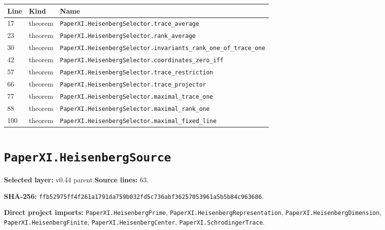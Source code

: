 \documentclass[10pt,oneside]{book}
\begin{document}
\begin{longtable}{@{}p{}p{}p{}@{}}\toprule Line&Kind&Name\\\midrule\endhead

17&theorem&\nolinkurl{PaperXI.HeisenbergSelector.trace_average}\\

23&theorem&\nolinkurl{PaperXI.HeisenbergSelector.rank_average}\\

30&theorem&\nolinkurl{PaperXI.HeisenbergSelector.invariants_rank_one_of_trace_one}\\

42&theorem&\nolinkurl{PaperXI.HeisenbergSelector.coordinates_zero_iff}\\

57&theorem&\nolinkurl{PaperXI.HeisenbergSelector.trace_restriction}\\

66&theorem&\nolinkurl{PaperXI.HeisenbergSelector.trace_projector}\\

77&theorem&\nolinkurl{PaperXI.HeisenbergSelector.maximal_trace_one}\\

88&theorem&\nolinkurl{PaperXI.HeisenbergSelector.maximal_rank_one}\\

100&theorem&\nolinkurl{PaperXI.HeisenbergSelector.maximal_fixed_line}\\

\bottomrule\end{longtable}

\section{\texorpdfstring{\nolinkurl{PaperXI.HeisenbergSource}}{PaperXI.HeisenbergSource}}\label{module:PaperXI.HeisenbergSource}

\textbf{Selected layer:} v0.44 parent.\quad\textbf{Source lines:} 63.\par\textbf{SHA-256:} {\scriptsize\nolinkurl{ffb52975ff4f261a1791da759b032fd5c736abf36257053961a5b5b84c963686}}.


\textbf{Direct project imports:} \nolinkurl{PaperXI.HeisenbergPrime}, \nolinkurl{PaperXI.HeisenbergRepresentation}, \nolinkurl{PaperXI.HeisenbergDimension}, \nolinkurl{PaperXI.HeisenbergFinite}, \nolinkurl{PaperXI.HeisenbergCenter}, \nolinkurl{PaperXI.SchrodingerTrace}.
\end{document}
